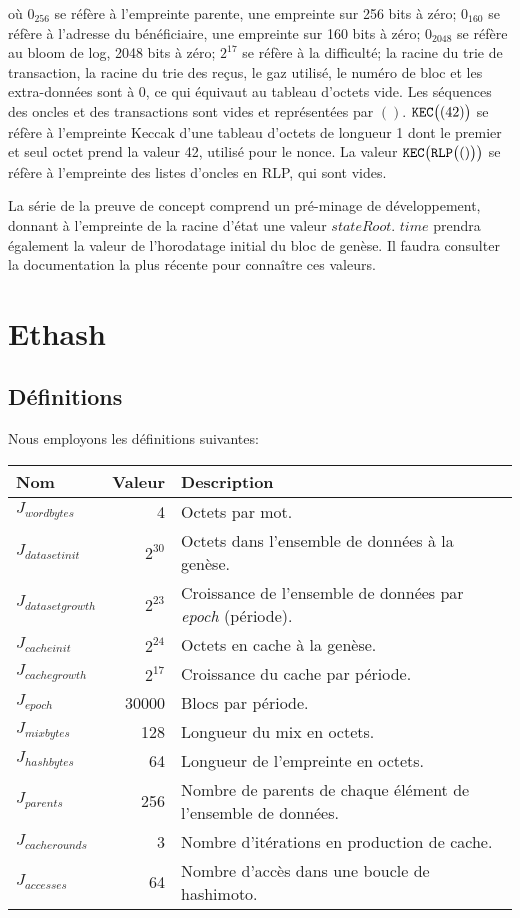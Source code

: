 \documentclass[9pt,oneside]{amsart}
\begin{document}
où  $0_{256}$ se réfère à l'empreinte parente, une empreinte sur 256 bits à zéro; $0_{160}$ se réfère à l'adresse du bénéficiaire, une empreinte sur 160 bits à zéro; $0_{2048}$ se réfère au bloom de log, 2048 bits à zéro; $2^{17}$ se réfère à la difficulté; la racine du trie de transaction, la racine du trie des reçus, le gaz utilisé, le numéro de bloc et les extra-données sont à $0$, ce qui équivaut au tableau d'octets vide. Les séquences des oncles et des transactions sont vides et représentées par $()$. $\mathtt{\tiny KEC}\big( (42) \big)$ se réfère à l'empreinte Keccak d'une tableau d'octets de longueur 1 dont le premier et seul octet prend la valeur 42, utilisé pour le nonce. La valeur $\mathtt{\tiny KEC}\big(\mathtt{\tiny RLP}\big( () \big)\big)$ se réfère à l'empreinte des listes d'oncles en RLP, qui sont vides.

La série de la preuve de concept comprend un pré-minage de développement, donnant à l'empreinte de la racine d'état une valeur $stateRoot$. $time$ prendra également la valeur de l'horodatage initial du bloc de genèse. Il faudra consulter la documentation la plus récente pour connaître ces valeurs.

\section{Ethash}\label{app:ethash}
\subsection{Définitions}
Nous employons les définitions suivantes:

\begin{tabular*}{\columnwidth}[h]{lrl}
\toprule
Nom & Valeur & Description \\
\midrule
$J_{wordbytes}$ & 4  & Octets par mot. \\
$J_{datasetinit}$ & $2^{30}$ & Octets dans l'ensemble de données à la genèse. \\
$J_{datasetgrowth}$ & $2^{23}$ & Croissance de l'ensemble de données par \textit{epoch} (période). \\
$J_{cacheinit}$ & $2^{24}$ & Octets en cache à la genèse. \\
$J_{cachegrowth}$ & $2^{17}$ & Croissance du cache par période. \\
$J_{epoch}$ & 30000 & Blocs par période. \\
$J_{mixbytes}$ & 128 & Longueur du mix en octets. \\
$J_{hashbytes}$ & 64 & Longueur de l'empreinte en octets. \\
$J_{parents}$ & 256 & Nombre de parents de chaque élément de l'ensemble de données. \\
$J_{cacherounds}$ & 3 & Nombre d'itérations en production de cache. \\
$J_{accesses}$ & 64 & Nombre d'accès dans une boucle de hashimoto. \\
\bottomrule
\end{tabular*}
\end{document}

